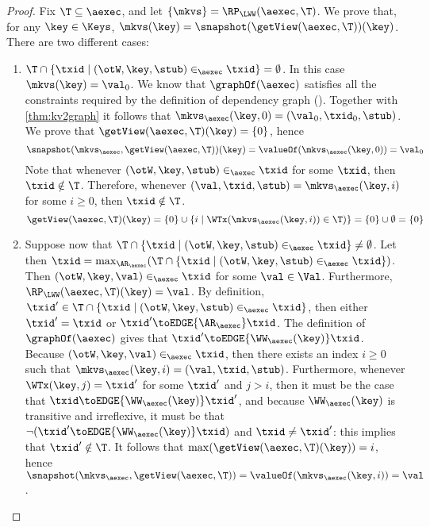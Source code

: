 \begin{proof}
Fix $\T \subseteq \aexec$, and let $\{\mkvs\} = \RP_{\LWW}(\aexec, \T)$. We prove that, for any $\key \in \Keys$, 
$\mkvs(\key) = \snapshot(\getView(\aexec, \T))(\key)$. There are two different cases: 
\begin{enumerate}
\item $\T \cap \{ \txid \mid (\otW, \key, \stub) \in_{\aexec} \txid \} = \emptyset$. 
In this case $\mkvs(\key) = \val_0$. 
We know that $\graphOf(\aexec)$ satisfies all the constraints required by the definition of dependency graph 
(\cite{laws}). Together with \cref{thm:kv2graph} it follows that $\mkvs_{\aexec}(\key, 0) = (\val_0, \txid_0, \stub)$.
We prove that $\getView(\aexec, \T)(\key) = \{0\}$, 
hence 
\[ 
\snapshot(\mkvs_{\aexec}, \getView(\aexec, \T))(\key) = \valueOf(\mkvs_{\aexec}(\key, 0)) = \val_{0}
\]
Note that whenever $(\otW, \key, \stub) \in_{\aexec} \txid$ for some $\txid$, then 
$\txid \notin \T$. Therefore, whenever $(\val, \txid, \stub) = \mkvs_{\aexec}(\key, i)$ for some $i \geq 0$, then 
$\txid \notin \T$.
\[
\getView(\aexec, \T)(\key) = \{0\} \cup \{i \mid \WTx(\mkvs_{\aexec}(\key, i)) \in \T)\} = \{0\} \cup \emptyset = \{0\}
\]
\item Suppose now that $\T \cap \{ \txid \mid (\otW, \key, \stub) \in_{\aexec} \txid \} \neq \emptyset$. 
Let then $\txid = \max_{\AR_{\aexec}}(\T \cap \{\txid \mid (\otW, \key, \stub) \in_{\aexec} \txid\})$. 
Then $(\otW, \key, \val) \in_{\aexec} \txid$ for some $\val \in \Val$. Furthermore, $\RP_{\LWW}(\aexec, \T)(\key) = \val$.
By definition, $\txid' \in \T \cap \{ \txid \mid (\otW, \key, \stub) \in_{\aexec} \txid\}$, 
then either $\txid' = \txid$ or $\txid' \toEDGE{\AR_{\aexec}} \txid$. The definition of 
$\graphOf(\aexec)$ gives that $\txid' \toEDGE{\WW_{\aexec}(\key)} \txid$. 
Because $(\otW, \key, \val) \in_{\aexec} \txid$, then there exists an index 
$i \geq 0$ such that $\mkvs_{\aexec}(\key, i) = (\val, \txid, \stub)$. Furthermore, 
whenever $\WTx(\key, j) = \txid'$ for some $\txid'$ and $j > i$, then it must 
be the case that $\txid \toEDGE{\WW_{\aexec}(\key)} \txid'$, and because 
$\WW_{\aexec}(\key)$ is transitive and irreflexive, it must be that  
$\neg( \txid' \toEDGE{\WW_{\aexec}(\key)} \txid)$ and $\txid \neq \txid'$: this implies that 
$\txid' \notin \T$. It follows that $\max(\getView(\aexec, \T)(\key)) = i$, hence 
$\snapshot(\mkvs_{\aexec}, \getView(\aexec, \T)) = \valueOf(\mkvs_{\aexec}(\key, i)) = \val$.
\end{enumerate}
\end{proof}

